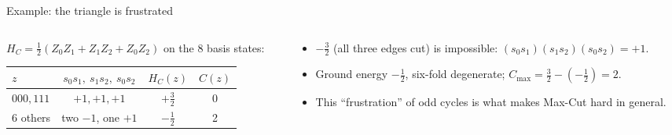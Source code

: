 \documentclass[aspectratio=169,11pt]{beamer}
\begin{document}
\begin{frame}{Example: the triangle is frustrated}
  \begin{columns}[c]
    \begin{column}{0.5\textwidth}
      $H_C = \tfrac12(Z_0Z_1 + Z_1Z_2 + Z_0Z_2)$ on the 8 basis states:
      \begin{center}\small
      \begin{tabular}{lccc}
        \toprule $z$ & $s_0s_1,\ s_1s_2,\ s_0s_2$ & $H_C(z)$ & $C(z)$\\ \midrule
        $000, 111$ & $+1, +1, +1$ & $+\tfrac32$ & 0\\
        6 others & two $-1$, one $+1$ & $-\tfrac12$ & 2\\ \bottomrule
      \end{tabular}
      \end{center}
    \end{column}
    \begin{column}{0.46\textwidth}
      \begin{itemize}
        \item $-\tfrac32$ (all three edges cut) is impossible: $(s_0s_1)(s_1s_2)(s_0s_2) = +1$.
        \item Ground energy $-\tfrac12$, six-fold degenerate; $C_{\max} = \tfrac32 - (-\tfrac12) = 2$.
        \item This ``frustration'' of odd cycles is what makes Max-Cut hard in general.
      \end{itemize}
    \end{column}
  \end{columns}
\end{frame}

\end{document}
